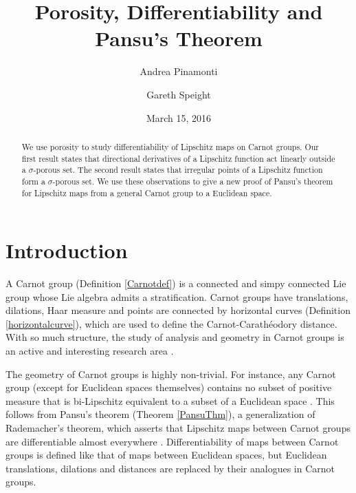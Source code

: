 \documentclass[reqno, 11pt]{amsart}
\theoremstyle{definition}
\theoremstyle{remark}
\numberwithin{theorem}{section}
\numberwithin{equation}{section}
\begin{document}
\title[Porosity, Differentiability and Pansu's Theorem]{Porosity, Differentiability and Pansu's Theorem}
\author[Andrea Pinamonti]{Andrea Pinamonti}
\address[Andrea Pinamonti]{University of Bologna, Italy}
\author[Gareth Speight]{Gareth Speight}
\address[Gareth Speight]{University of Cincinnati, United States}

\date{March 15, 2016}



\begin{abstract}
We use porosity to study differentiability of Lipschitz maps on Carnot groups. Our first result states that directional derivatives of a Lipschitz function act linearly outside a $\sigma$-porous set. The second result states that irregular points of a Lipschitz function form a $\sigma$-porous set. We use these observations to give a new proof of Pansu's theorem for Lipschitz maps from a general Carnot group to a Euclidean space.
\end{abstract}

\maketitle

\section{Introduction}

A Carnot group (Definition \ref{Carnotdef}) is a connected and simpy connected Lie group whose Lie algebra admits a stratification. Carnot groups have translations, dilations, Haar measure and points are connected by horizontal curves (Definition \ref{horizontalcurve}), which are used to define the Carnot-Carath\'eodory distance. With so much structure, the study of analysis and geometry in Carnot groups is an active and interesting research area \cite{ABB, B94, BLU, CDPT07, Gro96, Mon02, SC16, Vit14}. 

The geometry of Carnot groups is highly non-trivial. For instance, any Carnot group (except for Euclidean spaces themselves) contains no subset of positive measure that is bi-Lipschitz equivalent to a subset of a Euclidean space \cite{Sem96}. This follows from Pansu's theorem (Theorem \ref{PansuThm}), a generalization of Rademacher's theorem, which asserts that Lipschitz maps between Carnot groups are differentiable almost everywhere \cite{PP, Mag01}. Differentiability of maps between Carnot groups is defined like that of maps between Euclidean spaces, but Euclidean translations, dilations and distances are replaced by their analogues in Carnot groups. 
\end{document}
